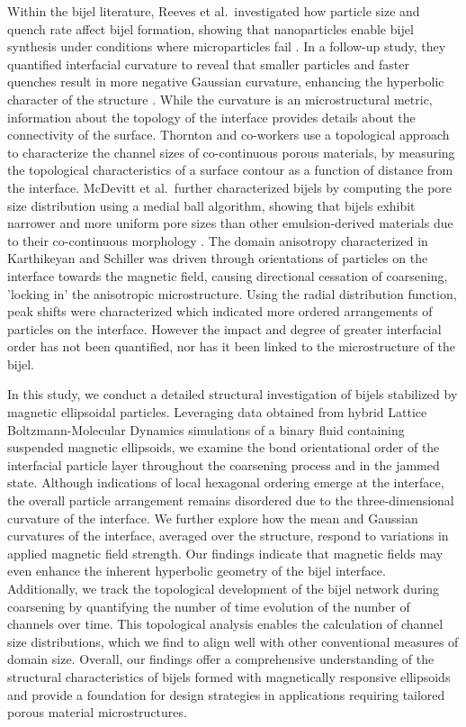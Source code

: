 Within the bijel literature, Reeves et al.~investigated how particle size and quench rate affect bijel formation, showing that nanoparticles enable bijel synthesis under conditions where microparticles fail 
\cite{reeves_particle-size_2015}. In a follow-up study, they quantified interfacial curvature to reveal that smaller particles and faster quenches result in more negative Gaussian curvature, enhancing the 
hyperbolic character of the structure \cite{reeves_quantitative_2016}. While the curvature is an microstructural metric, information about the topology of the interface provides details about the 
connectivity of the surface. \cite{mendoza_evolution_2006,chan_channel_2012} Thornton and co-workers use a topological approach to characterize the channel sizes of co-continuous porous materials, 
by measuring the topological characteristics of a surface contour as a function of distance from the interface. \cite{chan_channel_2012} McDevitt et al.~further characterized bijels by computing the pore 
size distribution using a medial ball algorithm, showing that bijels exhibit narrower and more uniform pore sizes than other emulsion-derived materials due to their co-continuous morphology 
\cite{mcdevitt_microstructural_2019}. The domain anisotropy characterized in Karthikeyan and Schiller was driven through orientations of particles on the interface towards the magnetic field, causing directional
cessation of coarsening, 'locking in' the anisotropic microstructure. Using the radial distribution function, peak shifts were characterized which indicated more ordered arrangements of particles
on the interface. However the impact and degree of greater interfacial order has not been quantified, nor has it been linked to the microstructure of the bijel. 

In this study, we conduct a detailed structural investigation of bijels stabilized by magnetic ellipsoidal particles. Leveraging data obtained from hybrid Lattice Boltzmann-Molecular Dynamics simulations of a 
binary fluid containing suspended magnetic ellipsoids, we examine the bond orientational order of the interfacial particle layer throughout the coarsening process and in the jammed state. Although indications 
of local hexagonal ordering emerge at the interface, the overall particle arrangement remains disordered due to the three-dimensional curvature of the interface. We further explore how the mean 
and Gaussian curvatures of the interface, averaged over the structure, respond to variations in applied magnetic field strength. Our findings indicate that magnetic fields may even enhance the 
inherent hyperbolic geometry of the bijel interface. Additionally, we track the topological development of the bijel network during coarsening by quantifying the number of time evolution of the number of channels
over time. This topological analysis enables the calculation of channel size distributions, which we find to align well with other conventional measures of domain size. Overall, our findings offer a comprehensive 
understanding of the structural characteristics of bijels formed with magnetically responsive ellipsoids and provide a foundation for design strategies in applications requiring tailored porous material 
microstructures.

